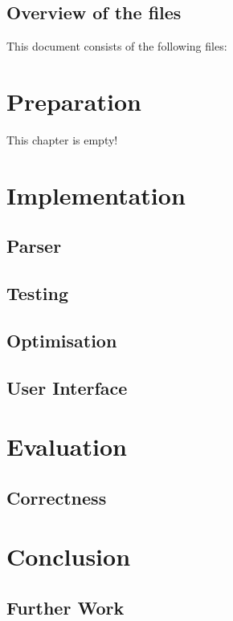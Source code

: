 \documentclass[12pt,twoside,notitlepage]{report}
\begin{document}
\section{Overview of the files}

This document consists of the following files:

\cleardoublepage
\chapter{Preparation}

This chapter is empty!

\cleardoublepage
\chapter{Implementation}

\section{Parser}

\section{Testing}

\section{Optimisation}

\section{User Interface}

\cleardoublepage
\chapter{Evaluation}

\section{Correctness}

\cleardoublepage
\chapter{Conclusion}

\section{Further Work}
\cleardoublepage
\end{document}
